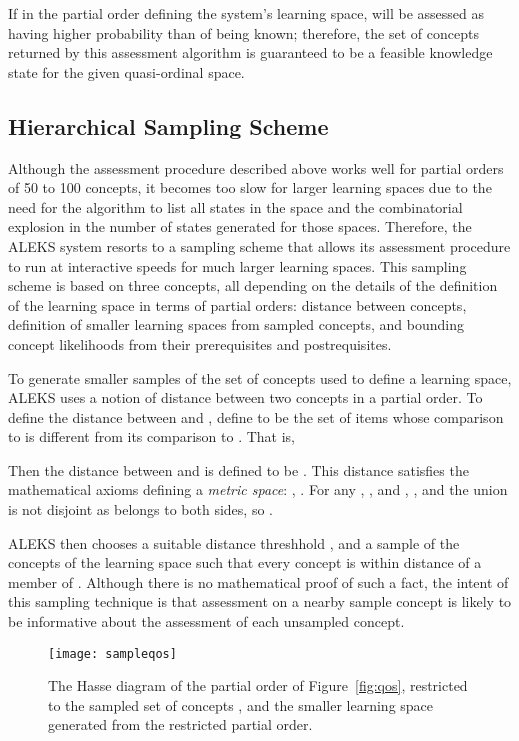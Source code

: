 \documentclass[11pt]{llncs}
\begin{document}
{If  in the partial order defining the system's learning space,  will be assessed as having higher probability than  of being known; therefore, the set of concepts returned by this assessment algorithm is guaranteed to be a feasible knowledge state for the given quasi-ordinal space.

\subsection{Hierarchical Sampling Scheme}

Although the assessment procedure described above works well for partial orders of 50 to 100 concepts, it becomes too slow for larger learning spaces due to the need for the algorithm to list all states in the space and the combinatorial explosion in the number of states generated for those spaces. Therefore, the ALEKS system resorts to a sampling scheme that allows its assessment procedure to run at interactive speeds for much larger learning spaces. This sampling scheme is based on three concepts, all depending on the details of the definition of the learning space in terms of partial orders: distance between concepts, definition of smaller learning spaces from sampled concepts, and bounding concept likelihoods from their prerequisites and postrequisites.

To generate smaller samples of the set of concepts used to define a learning space, ALEKS uses a notion of distance between two concepts in a partial order. To define the distance between  and ,
define  to be the set of items whose comparison to  is different from its comparison to . That is,

Then the distance  between  and  is defined to be .
This distance satisfies the mathematical axioms defining a \emph{metric space}: , . For any , , and ,
, and the union is not disjoint as  belongs to both sides, so .

ALEKS then chooses a suitable distance threshhold , and a sample  of the concepts of the learning space such that every concept is within distance  of a member of . Although there is no mathematical proof of such a fact, the intent of this sampling technique is that assessment on a nearby sample concept is likely to be informative about the assessment of each unsampled concept.

\begin{figure}[t]
\centering\texttt{[image: sampleqos]}
\caption{The Hasse diagram of the partial order of Figure~\ref{fig:qos}, restricted to the sampled set of concepts , and the smaller learning space generated from the restricted partial order.}
\label{fig:sampleqos}
\end{figure}

}
\end{document}

